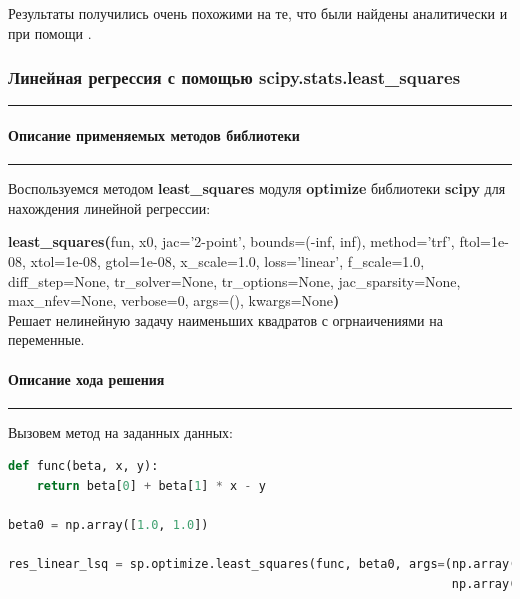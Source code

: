 \documentclass[a4paper, 14pt]{extarticle}
\begin{document}
Результаты получились очень похожими на те, что были найдены аналитически и при помощи .

\subsubsection*{{Линейная регрессия с помощью scipy.stats.least\_squares}}\vspace{-20pt}\rule{\linewidth}{0.1mm}
\vspace{-30pt}\paragraph*{{Описание применяемых методов библиотеки}}\vspace{-20pt}\rule{\linewidth}{0.1mm}

Воспользуемся методом \textbf{least\_squares} модуля \textbf{optimize} библиотеки \textbf{scipy} для 
нахождения линейной регрессии:

\begin{tcolorbox}[colback=mygray, boxrule=0pt, arc=0pt]
    \textbf{least\_squares(}fun, x0, jac='2-point', bounds=(-inf, inf), 
    method='trf', ftol=1e-08, xtol=1e-08, gtol=1e-08, x\_scale=1.0, loss='linear', 
    f\_scale=1.0, diff\_step=None, tr\_solver=None, tr\_options=None, jac\_sparsity=None, 
    max\_nfev=None, verbose=0, args=(), kwargs=None\textbf{)} \\
    Решает нелинейную задачу наименьших квадратов с огрнаичениями на переменные.
\end{tcolorbox}

\paragraph*{{Описание хода решения}}\vspace{-20pt}\rule{\linewidth}{0.1mm}

Вызовем метод на заданных данных:

\begin{center}
    \begin{lstlisting}[language=Python]
def func(beta, x, y):
    return beta[0] + beta[1] * x - y

beta0 = np.array([1.0, 1.0])

res_linear_lsq = sp.optimize.least_squares(func, beta0, args=(np.array(x_values_), 
                                                              np.array(y_values_)))
    \end{lstlisting}
\end{center}
\end{document}
